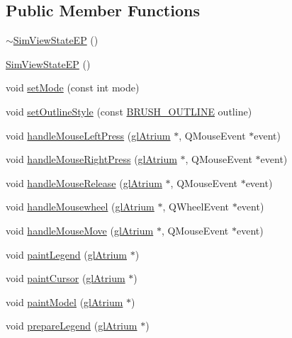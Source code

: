 \subsection*{Public Member Functions}
\begin{DoxyCompactItemize}
\item 
\hyperlink{class_sim_view_state_e_p_aa994e811ee4eb85f564f5bac5ff60042}{$\sim$\+Sim\+View\+State\+E\+P} ()
\item 
\hyperlink{class_sim_view_state_e_p_a32f99c8f47d2b2f6eb499852e4dbe7fd}{Sim\+View\+State\+E\+P} ()
\item 
void \hyperlink{class_sim_view_state_e_p_aba966e899aefd372056a297b4b548617}{set\+Mode} (const int mode)
\item 
void \hyperlink{class_sim_view_state_e_p_abb6fc8658ac934c2e89e73369545dcd1}{set\+Outline\+Style} (const \hyperlink{_sim_view_state_8h_a64cb6e33858a4b9db209712bab2f0e99}{B\+R\+U\+S\+H\+\_\+\+O\+U\+T\+L\+I\+N\+E} outline)
\item 
void \hyperlink{class_sim_view_state_e_p_a5a6017c556c686abfa5448307b972246}{handle\+Mouse\+Left\+Press} (\hyperlink{classgl_atrium}{gl\+Atrium} $\ast$, Q\+Mouse\+Event $\ast$event)
\item 
void \hyperlink{class_sim_view_state_e_p_a9865b939ec1f27b0769cc154fdecbb80}{handle\+Mouse\+Right\+Press} (\hyperlink{classgl_atrium}{gl\+Atrium} $\ast$, Q\+Mouse\+Event $\ast$event)
\item 
void \hyperlink{class_sim_view_state_e_p_aa2acd865c23f62612f50b2a889fffb04}{handle\+Mouse\+Release} (\hyperlink{classgl_atrium}{gl\+Atrium} $\ast$, Q\+Mouse\+Event $\ast$event)
\item 
void \hyperlink{class_sim_view_state_e_p_a4e12ee474236a13bd1ab0c44c69b4896}{handle\+Mousewheel} (\hyperlink{classgl_atrium}{gl\+Atrium} $\ast$, Q\+Wheel\+Event $\ast$event)
\item 
void \hyperlink{class_sim_view_state_e_p_a1c305958bc20ac6d16a4460b08444f1a}{handle\+Mouse\+Move} (\hyperlink{classgl_atrium}{gl\+Atrium} $\ast$, Q\+Mouse\+Event $\ast$event)
\item 
void \hyperlink{class_sim_view_state_e_p_ac02b3a96c6cad6cab41ff668fb70db83}{paint\+Legend} (\hyperlink{classgl_atrium}{gl\+Atrium} $\ast$)
\item 
void \hyperlink{class_sim_view_state_e_p_a42cf30be08ad247c6e96494f69228b72}{paint\+Cursor} (\hyperlink{classgl_atrium}{gl\+Atrium} $\ast$)
\item 
void \hyperlink{class_sim_view_state_e_p_a178f42d37a3195fc55344701779bdc39}{paint\+Model} (\hyperlink{classgl_atrium}{gl\+Atrium} $\ast$)
\item 
void \hyperlink{class_sim_view_state_e_p_a5783cc798a85d0633e4be298431eb310}{prepare\+Legend} (\hyperlink{classgl_atrium}{gl\+Atrium} $\ast$)
\end{DoxyCompactItemize}

